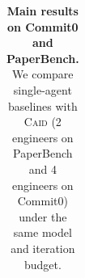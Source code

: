 \begin{table}[h]
{\begin{tabular}{l c ccc ccc ccc}
\bottomrule
\end{tabular}
}
\caption{\textbf{Main results on Commit0 and PaperBench.} We compare single-agent baselines with \textsc{Caid} (2 engineers on PaperBench and 4 engineers on Commit0) under the same model and iteration budget.}
\label{tab:main-results}
\end{table}

